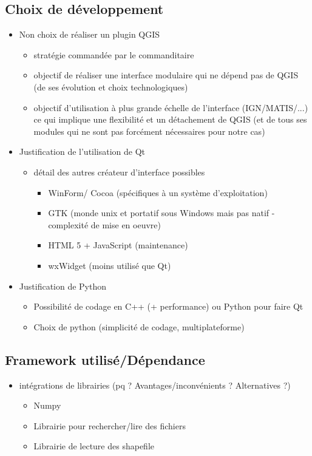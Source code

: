 \subsection{Choix de développement}
\begin{itemize}
	\item Non choix de réaliser un plugin QGIS
	\begin{itemize}
		\item stratégie commandée par le commanditaire
		\item objectif de réaliser une interface modulaire qui ne dépend pas de QGIS (de ses évolution et choix technologiques)
		\item objectif d'utilisation à plus grande échelle de l'interface (IGN/MATIS/...) ce qui implique une flexibilité et un détachement de QGIS (et de tous ses modules qui ne sont pas forcément nécessaires pour notre cas)
	\end{itemize}
	\item Justification de l'utilisation de Qt
		\begin{itemize}
		\item détail des autres créateur d'interface possibles 
		\begin{itemize}
			\item WinForm/ Cocoa (spécifiques à un système d'exploitation)
			\item GTK (monde unix et portatif sous Windows mais pas natif - complexité de mise en oeuvre)
			\item HTML 5 + JavaScript (maintenance)
			\item wxWidget (moins utilisé que Qt)
		\end{itemize}
	\end{itemize}
	\item Justification de Python
	\begin{itemize}
		\item Possibilité de codage en C++ (+ performance) ou Python pour faire Qt
		\item Choix de python (simplicité de codage, multiplateforme)
	\end{itemize}
\end{itemize}
	
\subsection{Framework utilisé/Dépendance}
\begin{itemize}
	\item intégrations de librairies (pq ? Avantages/inconvénients ? Alternatives ?)
	\begin{itemize}
		\item Numpy
		\item Librairie pour rechercher/lire des fichiers
		\item Librairie de lecture des shapefile
	\end{itemize}
\end{itemize}

